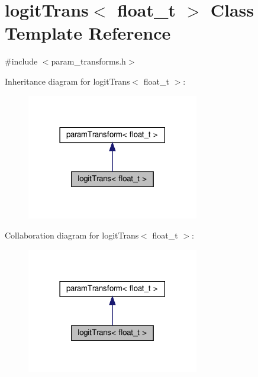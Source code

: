 \hypertarget{classlogitTrans}{}\section{logit\+Trans$<$ float\+\_\+t $>$ Class Template Reference}
\label{classlogitTrans}


{\ttfamily \#include $<$param\+\_\+transforms.\+h$>$}



Inheritance diagram for logit\+Trans$<$ float\+\_\+t $>$\+:
\nopagebreak
\begin{figure}[H]
\begin{center}
\leavevmode
\includegraphics[width=213pt]{classlogitTrans__inherit__graph}
\end{center}
\end{figure}


Collaboration diagram for logit\+Trans$<$ float\+\_\+t $>$\+:
\nopagebreak
\begin{figure}[H]
\begin{center}
\leavevmode
\includegraphics[width=213pt]{classlogitTrans__coll__graph}
\end{center}
\end{figure}
